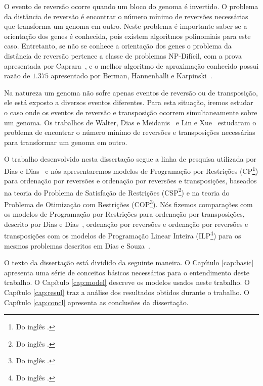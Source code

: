 
O evento de reversão ocorre quando um bloco do genoma é invertido. O
problema da distância de reversão é encontrar o número mínimo de
reversões necessárias que transforma um genoma em outro. Neste
problema é importante saber se a orientação dos genes é conhecida,
pois existem algoritmos polinomiais para este caso. Entretanto, se não
se conhece a orientação dos genes o problema da distância de reversão
pertence a classe de problemas NP-Difícil, com a prova apresentada por
Caprara~\cite{Caprara*1997}, e o melhor algoritmo de aproximação
conhecido possui razão de $1.375$ apresentado por Berman,
Hannenhalli e Karpinski~\cite{BermanHannenhalliKarpinski*2002}.

Na natureza um genoma não sofre apenas eventos de reversão ou de
transposição, ele está exposto a diversos eventos diferentes. Para
esta situação, iremos estudar o caso onde os eventos de reversão e
transposição ocorrem simultaneamente sobre um genoma. Os trabalhos de
Walter, Dias e
Meidanis~\cite{MeidanisWalterDias*2002,WalterDiasMeidanis*1998} e Lin
e Xue~\cite{LinXue*1999} estudaram o problema de encontrar o número
mínimo de reversões e transposições necessárias para transformar um
genoma em outro.

O trabalho desenvolvido nesta dissertação segue a linha de pesquisa
utilizada por Dias e Dias~\cite{DiasDias*2009} e nós apresentaremos
modelos de Programação por Restrições (CP\footnote{Do
inglês .}) para ordenação por reversões e
ordenação por reversões e transposições, baseados na teoria do
Problema de Satisfação de Restrições (CSP\footnote{Do
inglês .}) e na teoria do
Problema de Otimização com Restrições (COP\footnote{Do
inglês .}). Nós fizemos
comparações com os modelos de Programação por Restrições para
ordenação por transposições, descrito por Dias e
Dias~\cite{DiasDias*2009}, ordenação por reversões e ordenação por
reversões e transposições com os modelos de Programação Linear Inteira
(ILP\footnote{Do inglês .}) para os
mesmos problemas descritos em Dias e Souza~\cite{DiasSouza*2007}.

O texto da dissertação está dividido da seguinte maneira. O
Capítulo \ref{cap:basic} apresenta uma série de conceitos básicos
necessários para o entendimento deste trabalho. O
Capítulo \ref{cap:model} descreve os modelos usados neste trabalho. O
Capítulo \ref{cap:resul} traz a análise dos resultados obtidos durante
o trabalho. O Capítulo \ref{cap:concl} apresenta as conclusões da
dissertação.
